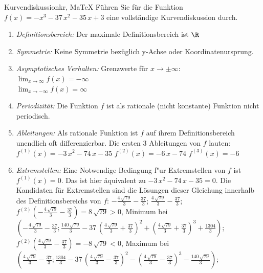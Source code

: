  \providecommand{\MoIl}{(} 
 \providecommand{\MoIr}{)}
 \providecommand{\MIntvlSep}{;} 
 \providecommand{\MElSetSep}{;} 
 \begin{MAufgabe}{Kurvendiskussion}{kr, MaTeX}
 F\"uhren Sie f\"ur die Funktion $f(x)= - x^3 - 37\, x^2 - 35\, x + 3$ eine vollst\"andige Kurvendiskussion durch.\\ 
 \ifLsg\Loesung
 \begin{enumerate}
 \item \emph{Definitionsbereich:} 
 Der maximale Definitionsbereich ist $\R$\item \emph{Symmetrie:} 
 Keine Symmetrie bez\"uglich y-Achse oder Koordinatenursprung.\item \emph{Asymptotisches Verhalten:} 
 Grenzwerte f\"ur $x\rightarrow \pm \infty$: \\ 
 $\lim_{x\rightarrow \infty} f(x)=- \infty$ \\ 
 $\lim_{x\rightarrow -\infty} f(x)=\infty$ \\ 
 \item \emph{Periodizit\"at:} 
 Die Funktion $f$ ist als rationale (nicht konstante) Funktion nicht periodisch.\item \emph{Ableitungen:} 
 Als rationale Funktion ist $f$ auf ihrem Definitionsbereich unendlich oft differenzierbar. 
 Die ersten 3 Ableitungen von $f$ lauten: \\ 
 $f^{(1)}(x)= - 3\, x^2 - 74\, x - 35$\newline 
  $f^{(2)}(x)= - 6\, x - 74$\newline 
  $f^{(3)}(x)=-6$\newline 
  \item \emph{Extremstellen:} 
 Eine Notwendige Bedingung f"ur Extremstellen von $f$ ist $f^{(1)}(x)=0$. 
 Das ist hier \"aquivalent zu $ - 3\, x^2 - 74\, x - 35=0$. 
 Die Kandidaten f\"ur Extremstellen sind die L\"osungen dieser Gleichung innerhalb des Definitionsbereichs von $f$: $ - \frac{4\, \sqrt{79}}{3} - \frac{37}{3}$; $\frac{4\, \sqrt{79}}{3} - \frac{37}{3}$; \\ 
 $f^{(2)}( - \frac{4\, \sqrt{79}}{3} - \frac{37}{3})=8\, \sqrt{79}$$>0$, Minimum bei $( - \frac{4\, \sqrt{79}}{3} - \frac{37}{3};\frac{140\, \sqrt{79}}{3} - 37\, {\left(\frac{4\, \sqrt{79}}{3} + \frac{37}{3}\right)}^2 + {\left(\frac{4\, \sqrt{79}}{3} + \frac{37}{3}\right)}^3 + \frac{1304}{3})$; \\ 
 $f^{(2)}(\frac{4\, \sqrt{79}}{3} - \frac{37}{3})=- 8\, \sqrt{79}$$<0$, Maximum bei $(\frac{4\, \sqrt{79}}{3} - \frac{37}{3};\frac{1304}{3} - 37\, {\left(\frac{4\, \sqrt{79}}{3} - \frac{37}{3}\right)}^2 - {\left(\frac{4\, \sqrt{79}}{3} - \frac{37}{3}\right)}^3 - \frac{140\, \sqrt{79}}{3})$; \\ 

\end{enumerate}
\end{MAufgabe}

